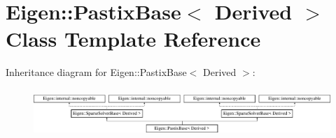\hypertarget{class_eigen_1_1_pastix_base}{}\section{Eigen\+:\+:Pastix\+Base$<$ Derived $>$ Class Template Reference}
\label{class_eigen_1_1_pastix_base}
Inheritance diagram for Eigen\+:\+:Pastix\+Base$<$ Derived $>$\+:\begin{figure}[H]
\begin{center}
\leavevmode
\includegraphics[height=1.810345cm]{class_eigen_1_1_pastix_base}
\end{center}
\end{figure}
